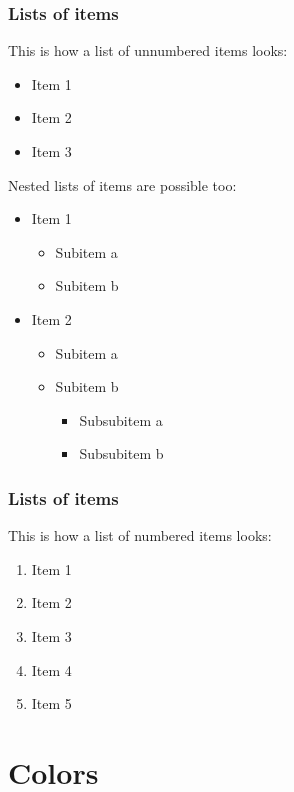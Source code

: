 \documentclass[aspectratio=169]{beamer}
\begin{document}
\begin{frame}
    \frametitle{Lists of items}
    This is how a list of unnumbered items looks:
    \begin{itemize}
        \item Item 1
        \item Item 2
        \item Item 3
    \end{itemize}
    \vspace{.25cm}
    Nested lists of items are possible too:
    \begin{itemize}
        \item Item 1
            \begin{itemize}
                \item Subitem a
                \item Subitem b
            \end{itemize}
        \item Item 2
            \begin{itemize}
                \item Subitem a
                \item Subitem b
                    \begin{itemize}
                        \item Subsubitem a
                        \item Subsubitem b
                    \end{itemize}
            \end{itemize}
    \end{itemize}
\end{frame}

\begin{frame}
    \frametitle{Lists of items}
    This is how a list of numbered items looks:\\[.25cm]
    \begin{enumerate}
        \itemsep.5cm
        \item Item 1
        \item Item 2
        \item Item 3
        \item Item 4
        \item Item 5
    \end{enumerate}
\end{frame}


\section{Colors}
\end{document}
